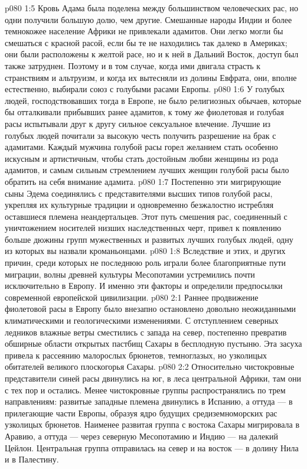 \vs p080 1:5 Кровь Адама была поделена между большинством человеческих рас, но одни получили большую долю, чем другие. Смешанные народы Индии и более темнокожее население Африки не привлекали адамитов. Они легко могли бы смешаться с красной расой, если бы те не находились так далеко в Америках; они были расположены к желтой расе, но и к ней в Дальний Восток, доступ был также затруднен. Поэтому и в том случае, когда ими двигала страсть к странствиям и альтруизм, и когда их вытесняли из долины Евфрата, они, вполне естественно, выбирали союз с голубыми расами Европы.
\vs p080 1:6 У голубых людей, господствовавших тогда в Европе, не было религиозных обычаев, которые бы отталкивали прибывших ранее адамитов, к тому же фиолетовая и голубая расы испытывали друг к другу сильное сексуальное влечение. Лучшие из голубых людей почитали за высокую честь получить разрешение на брак с адамитами. Каждый мужчина голубой расы горел желанием стать особенно искусным и артистичным, чтобы стать достойным любви женщины из рода адамитов, и самым сильным стремлением лучших женщин голубой расы было обратить на себя внимание адамита.
\vs p080 1:7 Постепенно эти мигрирующие сыны Эдема соединялись с представителями высших типов голубой расы, укрепляя их культурные традиции и одновременно безжалостно истребляя оставшиеся племена неандертальцев. Этот путь смешения рас, соединенный с уничтожением носителей низших наследственных черт, привел к появлению больше дюжины групп мужественных и развитых лучших голубых людей, одну из которых вы назвали кроманьонцами.
\vs p080 1:8 Вследствие и этих, и других причин, среди которых не последнюю роль играли более благоприятные пути миграции, волны древней культуры Месопотамии устремились почти исключительно в Европу. И именно эти факторы и определили предпосылки современной европейской цивилизации.
\vs p080 2:1 Раннее продвижение фиолетовой расы в Европу было внезапно остановлено довольно неожиданными климатическими и геологическими изменениями. С отступлением северных ледников влажные ветры сместились с запада на север, постепенно превратив обширные области открытых пастбищ Сахары в бесплодную пустыню. Эта засуха привела к рассеянию малорослых брюнетов, темноглазых, но узколицых обитателей великого плоскогорья Сахары.
\vs p080 2:2 Относительно чистокровные представители синей расы двинулись на юг, в леса центральной Африки, там они с тех пор и остались. Менее чистокровные группы распространялись по трем направлениям: развитые западные племена двинулись в Испанию, а оттуда --- в прилегающие части Европы, образуя ядро будущих средиземноморских рас узколицых брюнетов. Наименее развитая группа с востока Сахары мигрировала в Аравию, а оттуда --- через северную Месопотамию и Индию --- на далекий Цейлон. Центральная группа отправилась на север и на восток --- в долину Нила и в Палестину.
